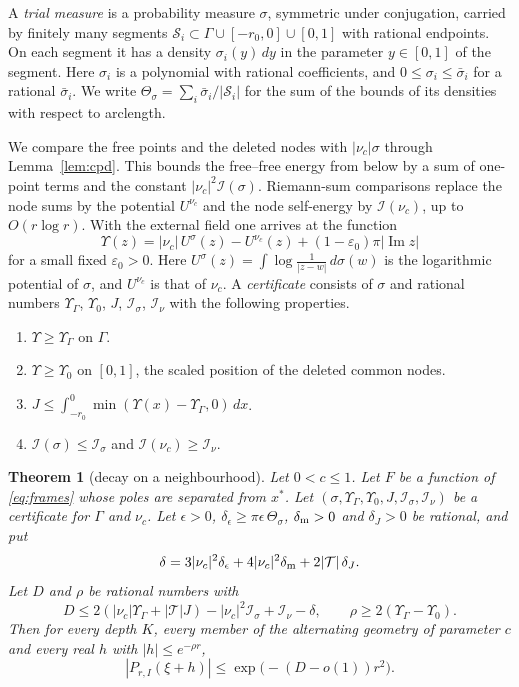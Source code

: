 \documentclass[11pt]{amsart}
\newtheorem{theorem}{Theorem}[section]
\theoremstyle{definition}
\theoremstyle{remark}
\numberwithin{equation}{section}
\renewcommand{\Im}{\operatorname{Im}}
\newcommand{\cI}{\mathcal I}
\begin{document}
A \emph{trial measure} is a probability measure $\sigma$, symmetric under conjugation, carried by finitely many
segments $\mathcal S_i\subset\Gamma\cup[-r_0,0]\cup[0,1]$ with rational endpoints. On each segment it has a density
$\sigma_i(y)\,dy$ in the parameter $y\in[0,1]$ of the segment. Here $\sigma_i$ is a polynomial with rational coefficients,
and $0\le\sigma_i\le\bar\sigma_i$ for a rational $\bar\sigma_i$. We write $\Theta_\sigma=\sum_i\bar\sigma_i/|\mathcal S_i|$
for the sum of the bounds of its densities with respect to arclength.

We compare the free points and the deleted nodes with $|\nu_c|\sigma$ through Lemma~\ref{lem:cpd}. This bounds the
free--free energy from below by a sum of one-point terms and the constant $|\nu_c|^2\cI(\sigma)$. Riemann-sum comparisons
replace the node sums by the potential $U^{\nu_c}$ and the node self-energy by $\cI(\nu_c)$, up to $O(r\log r)$. With the
external field one arrives at the function
\[
 \Upsilon(z)=|\nu_c|\,U^\sigma(z)-U^{\nu_c}(z)+(1-\varepsilon_0)\pi|\Im z|
\]
for a small fixed $\varepsilon_0>0$. Here $U^\sigma(z)=\int\log\frac1{|z-w|}\,d\sigma(w)$ is the logarithmic potential of
$\sigma$, and $U^{\nu_c}$ is that of $\nu_c$. A \emph{certificate} consists of $\sigma$ and rational numbers
$\Upsilon_\Gamma$, $\Upsilon_0$, $J$, $\cI_\sigma$, $\cI_\nu$ with the following properties.
\begin{enumerate}[label=(\alph*),leftmargin=*]
\item $\Upsilon\ge\Upsilon_\Gamma$ on $\Gamma$.
\item $\Upsilon\ge\Upsilon_0$ on $[0,1]$, the scaled position of the deleted common nodes.
\item $J\le\int_{-r_0}^0\min(\Upsilon(x)-\Upsilon_\Gamma,0)\,dx$.
\item $\cI(\sigma)\le\cI_\sigma$ and $\cI(\nu_c)\ge\cI_\nu$.
\end{enumerate}

\begin{theorem}[decay on a neighbourhood]\label{thm:decay}
Let $0<c\le1$. Let $F$ be a function of \eqref{eq:frames} whose poles are separated from $x^*$. Let
$(\sigma,\Upsilon_\Gamma,\Upsilon_0,J,\cI_\sigma,\cI_\nu)$ be a certificate for $\Gamma$ and $\nu_c$. Let $\epsilon>0$,
$\delta_\epsilon\ge\pi\epsilon\,\Theta_\sigma$, $\delta_{\rm m}>0$ and $\delta_J>0$ be rational, and put
\[
 \delta=3|\nu_c|^2\delta_\epsilon+4|\nu_c|^2\delta_{\rm m}+2|\mathcal T|\,\delta_J .
\]
Let $D$ and $\rho$ be rational numbers with
\[
 D\le2(|\nu_c|\Upsilon_\Gamma+|\mathcal T|J)-|\nu_c|^2\cI_\sigma+\cI_\nu-\delta,\qquad
 \rho\ge2(\Upsilon_\Gamma-\Upsilon_0).
\]
Then for every depth $K$, every member of the alternating geometry of parameter $c$ and every real $h$ with
$|h|\le e^{-\rho r}$,
\[
 |P_{r,I}(\xi+h)|\le\exp\bigl(-(D-o(1))r^2\bigr).
\]
\end{theorem}
\end{document}
